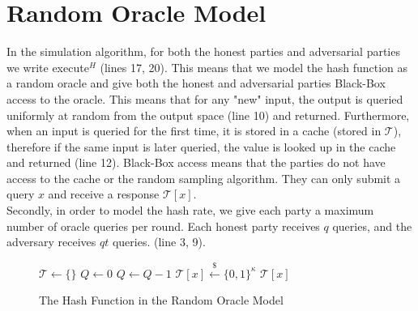 \section{Random Oracle Model}
In the simulation algorithm, for both the honest parties and adversarial parties we write {\textsf{execute}}$^H$ (lines 17, 20). This means that we model the hash function as a random oracle and give both the honest and adversarial parties Black-Box access to the oracle. This means that for any "new" input, the output is queried uniformly at random from the output space (line 10) and returned. Furthermore, when an input is queried for the first time, it is stored in a cache (stored in $\mathcal{T}$), therefore if the same input is later queried, the value is looked up in the cache and returned (line 12). Black-Box access means that the parties do not have access to the cache or the random sampling algorithm. They can only submit a query $x$ and receive a response $\mathcal{T}[x]$.
\\
Secondly, in order to model the hash rate, we give each party a maximum number of oracle queries per round. Each honest party receives $q$ queries, and the adversary receives $qt$ queries. (line 3, 9).
\begin{figure}[H]
\begin{algorithm}[H]
    \caption{\label{alg.hash} The Hash Function in the Random Oracle Model}
    \begin{algorithmic}[1]
        \State $\mathcal{T} \leftarrow \{\}$
        \State $Q \leftarrow 0$
             
                 
                    \State\Return{$\bot$}
                \EndIf
                \State $Q \leftarrow Q - 1$
                \State$\mathcal{T}[x] \overset{\$}{\leftarrow} \{0, 1\}^\kappa$
            \EndIf
            \State\Return$\mathcal{T}[x]$
        \EndFunction
        \vskip8pt
    \end{algorithmic}
\end{algorithm}
\end{figure}


